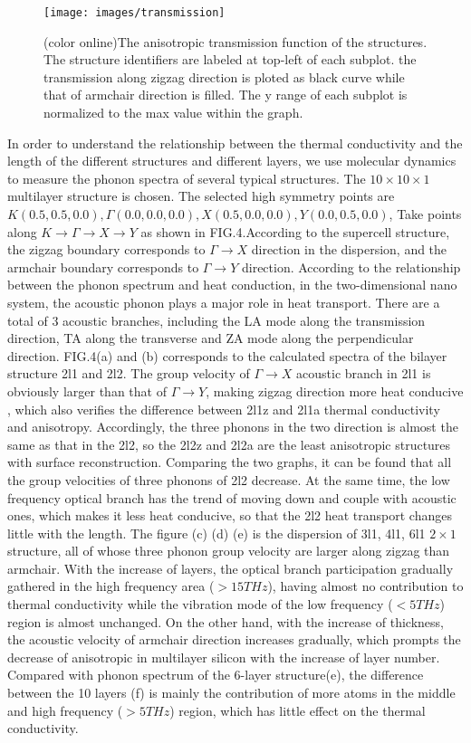 \documentclass[%
 reprint,
 amsmath,amssymb,
 aps,
 prb,
]{revtex4-1}
\begin{document}
\begin{figure}[b]
\texttt{[image: images/transmission]}
\caption{\label{fig:transmission} (color online)The anisotropic transmission function of the structures. The structure identifiers are labeled at top-left of each subplot. the transmission along zigzag direction is ploted as black curve while that of armchair direction is filled. The y range of each subplot is normalized to the max value within the graph.}
\end{figure}

In order to understand the relationship between the thermal conductivity and the length of the different structures and different layers, we use molecular dynamics to measure the phonon spectra of several typical structures. The $10 \times  10  \times  1$ multilayer structure is chosen. The selected high symmetry points are $K(0.5,0.5,0.0),\Gamma(0.0,0.0,0.0),X(0.5,0.0,0.0),  Y(0.0,0.5,0.0)$, Take points along $ K \rightarrow \Gamma \rightarrow X\rightarrow Y$ as shown in FIG.4.According to the supercell structure, the zigzag boundary corresponds to $ \Gamma \rightarrow X$ direction in the dispersion, and the armchair boundary corresponds to $\Gamma\rightarrow Y$ direction. According to the relationship between the phonon spectrum and heat conduction, in the two-dimensional nano system, the acoustic phonon plays a major role in heat transport. There are a total of 3 acoustic branches, including the LA mode along the transmission direction, TA along the transverse and ZA mode along the perpendicular direction. FIG.4(a) and (b) corresponds to the calculated spectra of the bilayer structure 2l1 and 2l2. The group velocity of $\Gamma\rightarrow X$ acoustic branch in 2l1 is obviously larger than that of $\Gamma\rightarrow Y$, making zigzag direction more heat conducive , which also verifies the difference between 2l1z and 2l1a thermal conductivity and anisotropy. Accordingly, the three phonons in the two direction is almost the same as that in the 2l2, so the 2l2z and 2l2a are the least anisotropic structures with surface reconstruction. Comparing the two graphs, it can be found that all the group velocities of three phonons of 2l2 decrease. At the same time, the low frequency optical branch has the trend of moving down and couple with acoustic ones, which makes it less heat conducive, so that the 2l2 heat transport changes little with the length. The figure (c) (d) (e) is the dispersion of 3l1, 4l1, 6l1 $2 \times 1$ structure, all of whose three phonon group velocity are larger along zigzag than armchair. With the increase of layers, the optical branch participation gradually gathered in the high frequency area ($>15THz$), having almost no contribution to thermal conductivity while the vibration mode of the low frequency ($<5THz$) region is almost unchanged. On the other hand, with the increase of thickness, the acoustic velocity of armchair direction increases gradually, which prompts the decrease of anisotropic in multilayer silicon with the increase of layer number. Compared with phonon spectrum of the 6-layer structure(e), the difference between the 10 layers (f) is mainly the contribution of more atoms in the middle and high frequency ($>5THz$) region, which has little effect on the thermal conductivity.
\end{document}
